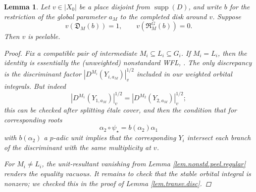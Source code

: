 \documentclass[openany]{amsbook}
\newtheorem{lemma}[theorem]{Lemma}
\theoremstyle{definition}
\theoremstyle{remark}
\numberwithin{equation}{section}
\renewcommand{\-}{\operatorname{-}}
\newcommand{\on}[1]{\operatorname{#1}}
\newcommand{\fD}{\mathfrak{D}}
\newcommand{\fR}{\mathfrak{R}}
\begin{document}
\begin{lemma}\label{lem.nonstd.transv.disc}
    Let $v \in |X_0|$ be a place disjoint from $\on{supp}(D)$, and write $b$ for the restriction of the global parameter $a_M$ to the completed disk around $v$. Suppose
    \begin{equation}
        v(\fD_{M}(b)) = 1, \qquad v(\fR_{M}^G(b)) = 0.\label{eqn.nonstd.transv.disc}
    \end{equation}
    Then $v$ is peelable.
    \begin{proof}
        Fix a compatible pair of intermediate $M_i \subseteq L_i \subseteq G_i$. If $M_i = L_i$, then the identity is essentially the (unweighted) nonstandard WFL, \cite[Th\'eor\`eme 1.12.7]{ngofl}. The only discrepancy is the discriminant factor $|D^{M_i}(Y_{i, a_M})|_v^{1/2}$ included in our weighted orbital integrals. But indeed
        $$
            |D^{M_1}(Y_{1, a_M})|_v^{1/2} = |D^{M_2}(Y_{2, a_M})|_v^{1/2};
        $$
        this can be checked after splitting \'etale cover, and then the condition that for corresponding roots 
        $$
            \alpha_2 \circ \psi_\star = b(\alpha_2) \alpha_1
        $$
        with $b(\alpha_2)$ a $p$-adic unit implies that the corresponding $Y_i$ intersect each branch of the discriminant with the same multiplicity at $v$.
        
        For $M_i \neq L_i$, the unit-resultant vanishing from Lemma \ref{lem.nonstd.peel.regular} renders the equality vacuous. It remains to check that the stable orbital integral is nonzero; we checked this in the proof of Lemma \ref{lem.transv.disc}.
    \end{proof}
\end{lemma}
\end{document}

